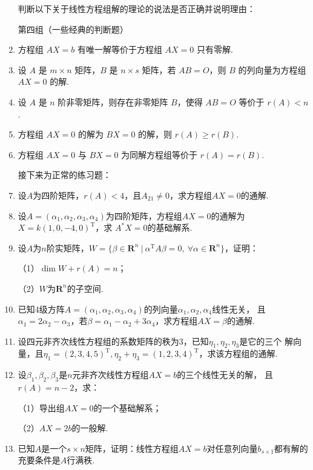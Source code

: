 \begin{enumerate}
	判断以下关于线性方程组解的理论的说法是否正确并说明理由：
	
	第四组（一些经典的判断题）
	
	\item 方程组 $AX=b$ 有唯一解等价于方程组 $AX=0$ 只有零解.
	
	\item 设 $A$ 是 $m \times n$ 矩阵，$B$ 是 $n \times s$ 矩阵，若 $AB=O$，则 $B$ 的列向量为方程组 $AX=0$ 的解.
	
	\item 设 $A$ 是 $n$ 阶非零矩阵，则存在非零矩阵 $B$，使得 $AB=O$ 等价于 $r(A)<n$.
	
	\item 方程组 $AX=0$ 的解为 $BX=0$ 的解，则 $r(A)\ge r(B)$.
	
	\item 方程组 $AX=0$ 与 $BX=0$ 为同解方程组等价于 $r(A)=r(B)$.
	
	接下来为正常的练习题：

	\item 设$A$为四阶矩阵，$r(A)<4$，且$A_{21}\neq 0$，求方程组$AX=0$的通解.
	\item 设$A=(\alpha_1,\alpha_2,\alpha_3,\alpha_4)$为四阶矩阵，方程组$AX=0$的通解为$X=k(1,0,-4,0)^\mathrm{T}$，求
	$A^*X=0$的基础解系.
	\item 设$A$为$n$阶实矩阵，$W=\{\beta\in\mathbf{R}^n\ |\ \alpha^\mathrm{T}A\beta=0,\ \forall \alpha\in\mathbf{R}^n\}$，证明：
	
	（1）$\dim W+r(A)=n$；

	（2）$W$为$\mathbf{R}^n$的子空间.
	\item 已知4级方阵$A=(\alpha_1,\alpha_2,\alpha_3,\alpha_4)$的列向量$\alpha_1,\alpha_2,\alpha_4$线性无关，
	且$\alpha_1=2\alpha_2-\alpha_3$，若$\beta=\alpha_1-\alpha_2+3\alpha_4$，求方程组$AX=\beta$的通解.
	\item 设四元非齐次线性方程组的系数矩阵的秩为3，已知$\eta_1,\eta_2,\eta_3$是它的三个
	解向量，且$\eta_1=(2,3,4,5)^\mathrm{T},\eta_2+\eta_3=(1,2,3,4)^\mathrm{T}$，求该方程组的通解.
	\item 设$\beta_1,\beta_2,\beta_3$是$n$元非齐次线性方程组$AX=b$的三个线性无关的解，
	且$r(A)=n-2$，求：

	（1）导出组$AX=0$的一个基础解系；

	（2）$AX=2b$的一般解.
	\item 已知$A$是一个$s\times n$矩阵，证明：线性方程组$AX=b$对任意列向量$b_{s\times 1}$都有解的充要条件是$A$行满秩.
\end{enumerate}

